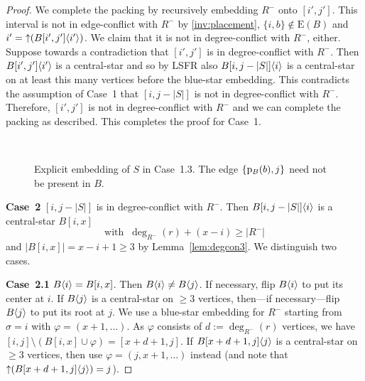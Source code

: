 \documentclass[11pt,a4paper,colorlinks=true,urlcolor=blue,citecolor=red]{article}
\theoremstyle{plain}
\newcommand{\case}[1]{\par\vspace{.5\baselineskip}\noindent\textbf{\sffamily Case~#1}}
\newcommand{\EB}{\mathrm{E}(B)}
\begin{document}
\begin{proof}
  We complete the packing by recursively embedding $R^-$ onto
  $[i',j']$. This interval is not in edge-conflict with $R^-$ by
  \ref{inv:placement}, $\{i,b\}\notin\EB$ and
  $i'=\mathop{\uparrow}(B{[i',j']}\langle{i'}\rangle)$. We claim that it is not in
  degree-conflict with $R^-$, either. Suppose towards a contradiction
  that $[i',j']$ is in degree-conflict with $R^-$. Then
  $B{[i',j']}\langle{i'}\rangle$ is a central-star and so by LSFR also
  $B{[i,j-|S|]}\langle{i}\rangle$ is a central-star on at least this many
  vertices before the blue-star embedding. This contradicts the
  assumption of Case~1 that $[i,j-|S|]$ is not in degree-conflict with
  $R^-$. Therefore, $[i',j']$ is not in degree-conflict with $R^-$ and
  we can complete the packing as described. This completes the proof for
  Case~1.

  \begin{figure}[thbp]
    \centering {}\hfil {}\hfil {}\\
    \hfil {}\hfil {}
    \caption{Explicit embedding of $S$ in Case~1.3. The edge
      $\{\mathrm p_B(b),j\}$ need not be present in
      $B$.\label{fig:general_inline2}}
  \end{figure}

  \case{2} $[i,j-|S|]$ is in degree-conflict with $R^-$. Then
  $B{[i,j-|S|]}\langle{i}\rangle$ is a central-star $B[i,x]$
\begin{equation}
    \label{eq:degconf}
    \mbox{with}\;\;\deg_{R^-}(r)+(x-i)\ge|R^-|
  \end{equation}
and $|B[i,x]|=x-i+1\ge 3$ by Lemma~\ref{lem:degcon3}. We distinguish
  two cases.

  \case{2.1} $B\langle{i}\rangle=B[i,x]$. Then $B\langle{i}\rangle\neq B\langle{j}\rangle$. If
  necessary, flip $B\langle{i}\rangle$ to put its center at $i$. If $B\langle{j}\rangle$
  is a central-star on $\ge 3$ vertices, then---if necessary---flip
  $B\langle{j}\rangle$ to put its root at $j$. We use a blue-star embedding
  for $R^-$ starting from $\sigma=i$ with $\varphi=(x+1,\ldots)$. As
  $\varphi$ consists of $d:=\deg_{R^-}(r)$ vertices, we have
  $[i,j]\setminus(B[i,x]\cup\varphi)=[x+d+1,j]$. If
  $B{[x+d+1,j]}\langle{j}\rangle$ is a central-star on $\ge 3$ vertices, then
  use $\varphi=(j,x+1,\ldots)$ instead (and note that
  $\mathop{\uparrow}(B{[x+d+1,j]}\langle{j}\rangle)=j$).


\end{proof}
\end{document}
